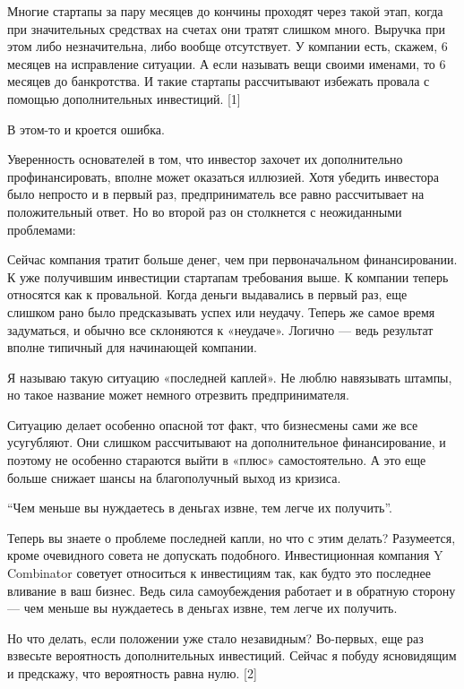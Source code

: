 \documentclass[ebook,12pt,oneside,openany]{memoir}
\begin{document}
\maketitle

Многие стартапы за пару месяцев до кончины проходят через такой этап,
когда при значительных средствах на счетах они тратят слишком много.
Выручка при этом либо незначительна, либо вообще отсутствует. У
компании есть, скажем, 6 месяцев на исправление ситуации. А если
называть вещи своими именами, то 6 месяцев до банкротства. И такие
стартапы рассчитывают избежать провала с помощью дополнительных
инвестиций. [1]

В этом-то и кроется ошибка.

Уверенность основателей в том, что инвестор захочет их дополнительно
профинансировать, вполне может оказаться иллюзией. Хотя убедить
инвестора было непросто и в первый раз, предприниматель все равно
рассчитывает на положительный ответ. Но во второй раз он столкнется с
неожиданными проблемами:

Сейчас компания тратит больше денег, чем при первоначальном
финансировании. К уже получившим инвестиции стартапам требования выше.
К компании теперь относятся как к провальной. Когда деньги выдавались
в первый раз, еще слишком рано было предсказывать успех или неудачу.
Теперь же самое время задуматься, и обычно все склоняются к «неудаче».
Логично — ведь результат вполне типичный для начинающей компании.

Я называю такую ситуацию «последней каплей». Не люблю навязывать
штампы, но такое название может немного отрезвить предпринимателя.

Ситуацию делает особенно опасной тот факт, что бизнесмены сами же все
усугубляют. Они слишком рассчитывают на дополнительное финансирование,
и поэтому не особенно стараются выйти в «плюс» самостоятельно. А это
еще больше снижает шансы на благополучный выход из кризиса.

“Чем меньше вы нуждаетесь в деньгах извне, тем легче их получить”.

Теперь вы знаете о проблеме последней капли, но что с этим делать?
Разумеется, кроме очевидного совета не допускать подобного.
Инвестиционная компания Y Combinator советует относиться к инвестициям
так, как будто это последнее вливание в ваш бизнес. Ведь сила
самоубеждения работает и в обратную сторону — чем меньше вы нуждаетесь
в деньгах извне, тем легче их получить.

Но что делать, если положении уже стало незавидным? Во-первых, еще раз
взвесьте вероятность дополнительных инвестиций. Сейчас я побуду
ясновидящим и предскажу, что вероятность равна нулю. [2]
\end{document}

